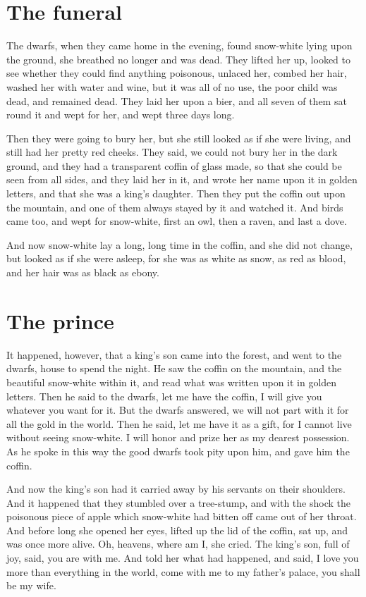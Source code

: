 \documentclass[a4paper,11pt]{article}
\begin{document}
\section{The funeral}

The dwarfs, when they came home in the evening, found snow-white
lying upon the ground, she breathed no longer and was dead.
They lifted her up, looked to see whether they could find
anything poisonous, unlaced her, combed her hair, washed her
with water and wine, but it was all of no use, the poor child was
dead, and remained dead.  They laid her upon a bier, and all
seven of them sat round it and wept for her, and wept three days
long.

Then they were going to bury her, but she still looked as if she
were living, and still had her pretty red cheeks.  They said,
we could not bury her in the dark ground, and they had a
transparent coffin of glass made, so that she could be seen from
all sides, and they laid her in it, and wrote her name upon it
in golden letters, and that she was a king's daughter.  Then they
put the coffin out upon the mountain, and one of them always
stayed by it and watched it.  And birds came too, and wept for
snow-white, first an owl, then a raven, and last a dove.

And now snow-white lay a long, long time in the coffin, and she
did not change, but looked as if she were asleep, for she was as
white as snow, as red as blood, and her hair was as black as
ebony.


\section{The prince}

It happened, however, that a king's son came into the forest, and
went to the dwarfs, house to spend the night.  He saw the coffin
on the mountain, and the beautiful snow-white within it, and read
what was written upon it in golden letters.  Then he said to the
dwarfs, let me have the coffin, I will give you whatever you want
for it.  But the dwarfs answered, we will not part with it for all
the gold in the world.  Then he said, let me have it as a gift, for
I cannot live without seeing snow-white.  I will honor and prize
her as my dearest possession.  As he spoke in this way the good
dwarfs took pity upon him, and gave him the coffin.

And now the king's son had it carried away by his servants on
their shoulders.  And it happened that they stumbled over a
tree-stump, and with the shock the poisonous piece of apple
which snow-white had bitten off came out of her throat.  And
before long she opened her eyes, lifted up the lid of the coffin,
sat up, and was
once more alive.  Oh, heavens, where am I, she cried.  The king's
son, full of joy, said, you are with me.  And told her what had
happened, and said, I love you more than everything in the
world, come with me to my father's palace, you shall be my wife.
\end{document}
